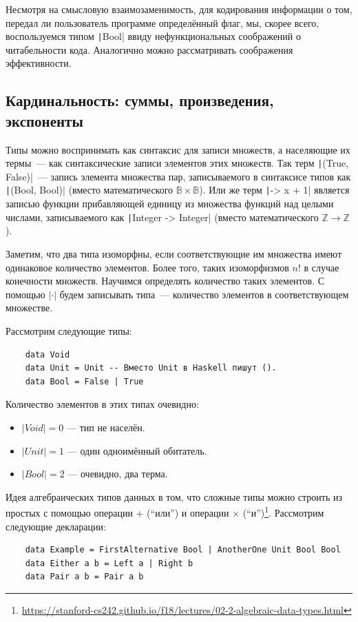 Несмотря на смысловую взаимозаменимость, для кодирования информации о том, передал ли пользователь программе определённый флаг, мы, скорее всего, воспользуемся типом \texttt|Bool| ввиду нефункциональных соображений о читабельности кода.
Аналогично можно рассматривать соображения эффективности.

\subsection{Кардинальность: суммы, произведения, экспоненты} \label{subsec:cardinality}

Типы можно воспринимать как синтаксис для записи множеств, а населяющие их термы~--- как синтаксические записи элементов этих множеств.
Так терм \texttt|(True, False)|~--- запись элемента множества пар, записываемого в синтаксисе типов как \texttt|(Bool, Bool)| (вместо математического $\mathbb{B}\times\mathbb{B}$).
Или же терм \texttt|\x -> x + 1| является записью функции прибавляющей единицу из множества функций над целыми числами, записываемого как \texttt|Integer -> Integer| (вместо математического $\mathbb{Z}\to\mathbb{Z}$).

Заметим, что два типа изоморфны, если соответствующие им множества имеют одинаковое количество элементов.
Более того, таких изоморфизмов $n!$ в случае конечности множеств.
Научимся определять количество таких элементов.
С помощью $|\cdot|$ будем записывать  типа~--- количество элементов в соответствующем множестве.

Рассмотрим следующие типы:
\begin{verbatim}
    data Void
    data Unit = Unit -- Вместо Unit в Haskell пишут ().
    data Bool = False | True
\end{verbatim}

Количество элементов в этих типах очевидно:
\begin{itemize}
    \item $|Void| = 0$ --- тип не населён.
    \item $|Unit| = 1$ --- один одноимённый обитатель.
    \item $|Bool| = 2$ --- очевидно, два терма.
\end{itemize}

Идея алгебраических типов данных в том, что сложные типы можно строить из простых с помощью операции $+$ (``или'') и операции $\times$ (``и'')\footnote{\url{https://stanford-cs242.github.io/f18/lectures/02-2-algebraic-data-types.html}}.
Рассмотрим следующие декларации:
\begin{verbatim}
    data Example = FirstAlternative Bool | AnotherOne Unit Bool Bool
    data Either a b = Left a | Right b
    data Pair a b = Pair a b
\end{verbatim}

